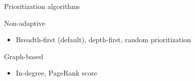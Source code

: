 
\begin{frame}{Prioritization algorithms \parencite{hartig2016walking}}
  \begin{block}{Non-adaptive}
    \begin{itemize}
        \item Breadth-first (default), depth-first, random prioritization
    \end{itemize}
  \end{block}
  \begin{block}{Graph-based}
        \begin{itemize}
        \item In-degree, PageRank score
    \end{itemize}
  \end{block}
\end{frame}


